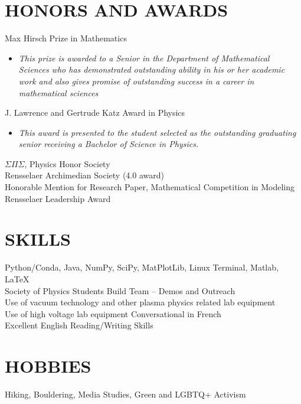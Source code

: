 \documentclass[margin]{rpires}
\begin{document}
\begin{resume}
\section{HONORS AND AWARDS} Max Hirsch Prize in Mathematics
                \begin{itemize}
                    \item[] {\sl This prize is awarded to a Senior in the Department of Mathematical Sciences who has demonstrated outstanding ability in his or her academic work and also gives promise of outstanding success in a career in mathematical sciences}
                \end{itemize}
                \vspace{-0.4cm}
                J. Lawrence and Gertrude Katz Award in Physics
                \begin{itemize} 
                    \item[] {\sl This award is presented to the student selected as the outstanding graduating senior receiving a Bachelor of Science in Physics.}
                \end{itemize}
                \vspace{-0.4cm}
                $\Sigma \Pi \Sigma$, Physics Honor Society \\
                Rensselaer Archimedian Society (4.0 award) \\
                Honorable Mention for Research Paper,       Mathematical Competition in Modeling \\
                Rensselaer Leadership Award 
 
\section{SKILLS}
Python/Conda, Java, NumPy, SciPy, MatPlotLib, Linux Terminal, Matlab, \LaTeX\\
Society of Physics Students Build Team – Demos and Outreach \\
Use of vacuum technology and other plasma physics related lab equipment\\
Use of high voltage lab equipment
Conversational in French\\
Excellent English Reading/Writing Skills \\

 
\section{HOBBIES}         Hiking, Bouldering, Media Studies, Green and LGBTQ+ Activism
 
\end{resume} 
\end{document}
